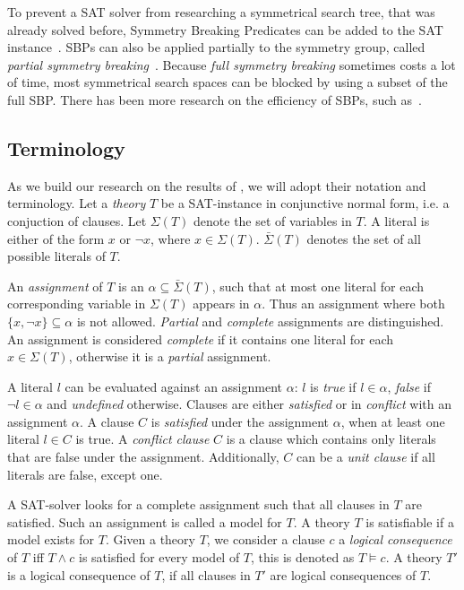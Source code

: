 To prevent a SAT solver from researching a symmetrical search tree, that was already solved
before, Symmetry Breaking Predicates can be added to the SAT
instance~\cite{sakallah2009symmetry}. SBPs can also be applied partially to the symmetry
group, called \textit{partial symmetry breaking}~\cite{sakallah2009symmetry}. Because
\textit{full symmetry breaking} sometimes costs a lot of time, most symmetrical search
spaces can be blocked by using a subset of the full SBP. There has been more research on
the efficiency of SBPs, such as~\cite{aloul2006efficient,aloul2003shatter,crawford1996symmetry}.

\subsection{Terminology}
	As we build our research on the results of \cite{devriendt2012symmetry}, we will adopt
	their notation and terminology.
	Let a \emph{theory} $T$ be a SAT-instance in conjunctive normal form, i.e. a conjuction
	of clauses.
	Let $\Sigma(T)$ denote the set of variables in $T$.
	A literal is either of the form	$x$ or $\neg x$, where $x \in \Sigma(T)$.
	$\bar\Sigma(T)$ denotes the set of all possible literals of $T$.

	An \emph{assignment} of $T$ is an $\alpha \subseteq \bar\Sigma(T)$, such that at most
	one literal for each corresponding variable in $\Sigma(T)$ appears in $\alpha$.
	Thus an assignment where both $\{x, \neg x\} \subseteq \alpha$ is not allowed.
	\emph{Partial} and \emph{complete} assignments are distinguished.
	An assignment is considered \emph{complete} if it contains one literal for each $x \in \Sigma(T)$,
	otherwise it is a \emph{partial} assignment.

	A literal $l$ can be evaluated against an assignment $\alpha$: $l$ is \emph{true} if $l \in
	\alpha$, \emph{false} if $\neg l \in \alpha$ and \emph{undefined} otherwise.
	Clauses are either \emph{satisfied} or in \emph{conflict} with an assignment $\alpha$.
	A clause $C$ is \emph{satisfied} under the assignment $\alpha$,
	when at least one literal $l \in C$ is true.
	A \emph{conflict clause} $C$ is a clause which contains only literals that are false under the assignment.
	Additionally, $C$ can be a \emph{unit clause} if all literals are false, except one.

	A SAT-solver looks for a complete assignment such that all clauses in $T$ are satisfied.
	Such an assignment is called a model for $T$.
	A theory $T$ is satisfiable if a model exists for $T$.
	Given a theory $T$, we consider a clause $c$ a \emph{logical consequence} of $T$ iff
	$T \wedge c$ is satisfied for every model of $T$, this is denoted as $T \models c$.
	A theory $T'$ is a logical consequence of $T$, if all clauses in $T'$ are logical
	consequences of $T$.

